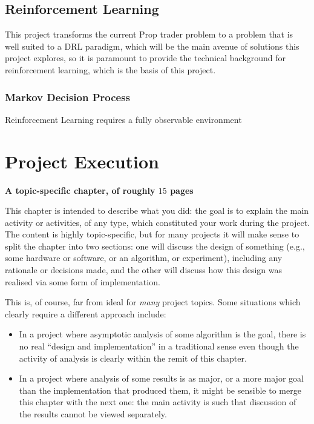 \documentclass[ %
                    author={Ashwinder Khurana},
                supervisor={Prof Dave Cliff},
                    degree={MEng},
                     title={The Deeply Reinforced Trader},
                  subtitle={},
                      type={enterprise},
                      year={2020} ]{dissertation}
\begin{document}
\section{Reinforcement Learning}

This project transforms the current Prop trader problem to a problem that is well suited to a DRL paradigm, which will be the main avenue of solutions this project explores, so it is paramount to provide the technical background for reinforcement learning, which is the basis of this project.

\subsection{Markov Decision Process}
Reinforcement Learning requires a fully observable environment 


\chapter{Project Execution}
\label{chap:execution}

{\bf A topic-specific chapter, of roughly $15$ pages} 
\vspace{1cm} 

\noindent
This chapter is intended to describe what you did: the goal is to explain
the main activity or activities, of any type, which constituted your work 
during the project.  The content is highly topic-specific, but for many 
projects it will make sense to split the chapter into two sections: one 
will discuss the design of something (e.g., some hardware or software, or 
an algorithm, or experiment), including any rationale or decisions made, 
and the other will discuss how this design was realised via some form of 
implementation.  

This is, of course, far from ideal for {\em many} project topics.  Some
situations which clearly require a different approach include:

\begin{itemize}
\item In a project where asymptotic analysis of some algorithm is the goal,
      there is no real ``design and implementation'' in a traditional sense
      even though the activity of analysis is clearly within the remit of
      this chapter.
\item In a project where analysis of some results is as major, or a more
      major goal than the implementation that produced them, it might be
      sensible to merge this chapter with the next one: the main activity 
      is such that discussion of the results cannot be viewed separately.
\end{itemize}
\end{document}
